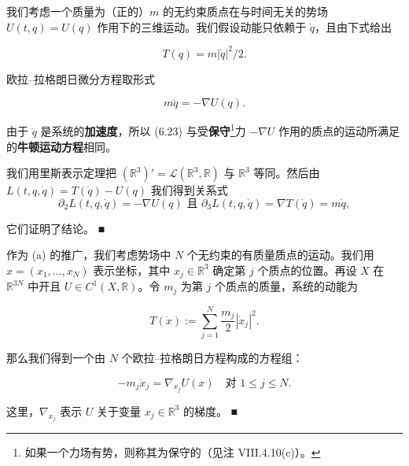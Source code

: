 \begin{example}

\begin{items}
\item

我们考虑一个质量为（正的）$ m $ 的无约束质点在与时间无关的势场 $ U(t, q) = U(q) $ 作用下的三维运动。我们假设动能只依赖于 $ \dot{q} $，且由下式给出

\[
T(\dot{q}) = m\left|\dot{q}\right|^{2}/2 .
\]

欧拉–拉格朗日微分方程取形式

\begin{equation}
m\ddot{q} = -\nabla U(q) .\tag{6.23}
\end{equation}

由于 $ \ddot{q} $ 是系统的\textbf{加速度}，所以 (6.23) 与受\textbf{保守}\footnote{如果一个力场有势，则称其为保守的（见注 VIII.4.10(c)）。}力 $ -\nabla U $ 作用的质点的运动所满足的\textbf{牛顿运动方程}相同。

\proofhead
我们用里斯表示定理把 $ (\mathbb{R}^{3})' = \mathcal{L}(\mathbb{R}^{3}, \mathbb{R}) $ 与 $ \mathbb{R}^{3} $ 等同。然后由 $ L(t, q, \dot{q}) = T(\dot{q}) - U(q) $ 我们得到关系式
\[
\partial_{2}L(t, q, \dot{q}) = -\nabla U(q) \text{ 且 } \partial_{3}L(t, q, \dot{q}) = \nabla T(\dot{q}) = m\dot{q} ,
\]

它们证明了结论。 \nobreak\hspace{0.35em}■

\item

作为 (a) 的推广，我们考虑势场中 $ N $ 个无约束的有质量质点的运动。我们用 $ x = (x_{1}, \ldots, x_{N}) $ 表示坐标，其中 $ x_{j} \in \mathbb{R}^{3} $ 确定第 $ j $ 个质点的位置。再设 $ X $ 在 $ \mathbb{R}^{3N} $ 中开且 $ U \in C^{1}(X, \mathbb{R}) $。令 $ m_{j} $ 为第 $ j $ 个质点的质量，系统的动能为

\[
T(\dot{x}) := \sum_{j=1}^{N}\frac{m_{j}}{2}\left|\dot{x}_{j}\right|^{2} .
\]

那么我们得到一个由 $ N $ 个欧拉–拉格朗日方程构成的方程组：

\[
-m_{j}\ddot{x}_{j} = \nabla_{x_{j}}U(x) \quad \text{对 } 1 \le j \le N .
\]

这里，$ \nabla_{x_{j}} $ 表示 $ U $ 关于变量 $ x_{j} \in \mathbb{R}^{3} $ 的梯度。 \nobreak\hspace{0.35em}■

\end{items}

\end{example}

